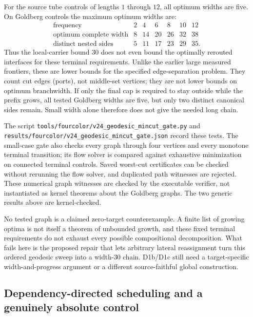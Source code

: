 For the source tube controls of lengths $1$ through $12$, all optimum
widths are five.  On Goldberg controls the maximum optimum widths are:
\[
\begin{array}{c|rrrrrr}
\text{frequency}&2&4&6&8&10&12\\ \hline
\text{optimum complete width}&8&14&20&26&32&38\\
\text{distinct nested sides}&5&11&17&23&29&35.
\end{array}
\]
Thus the local-carrier bound $30$ does not even bound the optimally rerouted
interfaces for these terminal requirements.  Unlike the earlier large
measured frontiers, these are lower bounds for the specified edge-separation
problem.  They count cut edges (ports), not middle-set vertices; they are
not lower bounds on optimum branchwidth.  If only the final
cap is required to stay outside while the prefix grows, all tested Goldberg
widths are five, but only two distinct canonical sides remain.  Small width
alone therefore does not give the needed long chain.

The script \texttt{tools/fourcolor/v24\_geodesic\_mincut\_gate.py} and
\texttt{results/fourcolor/v24\_geodesic\_mincut\_gate.json} record these
tests.  The small-case gate also checks every graph through four vertices
and every monotone terminal transition; its flow solver is compared against
exhaustive minimization on connected terminal controls.  Saved worst-cut
certificates can be checked without rerunning the flow solver, and duplicated
path witnesses are rejected.  These numerical graph witnesses are checked
by the executable verifier, not instantiated as kernel theorems about the
Goldberg graphs.  The two generic results above are kernel-checked.

No tested graph is a claimed zero-target counterexample.  A finite list of
growing optima is not itself a theorem of unbounded growth, and these fixed
terminal requirements do not exhaust every possible compositional
decomposition.  What fails here is the proposed repair that lets arbitrary
lateral reassignment turn this ordered geodesic sweep into a width-$30$
chain.  D1b/D1c still need a target-specific width-and-progress argument or
a different source-faithful global construction.

\subsection{Dependency-directed scheduling and a genuinely absolute control}
\label{sec:absolute-topology-gate}

